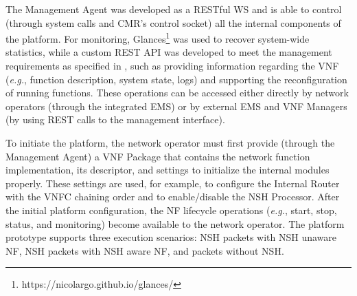 
The Management Agent was developed as a RESTful WS and is able to control (through system calls and CMR's control socket) all the internal components of the platform. For monitoring, Glances\footnote{https://nicolargo.github.io/glances/} was used to recover system-wide statistics, while a custom REST API was developed to meet the management requirements as specified in \cite{Bondan-2014}, such as providing information regarding the VNF (\textit{e.g.}, function description, system state, logs) and supporting the reconfiguration of running functions. These operations can be accessed either directly by network operators (through the integrated EMS) or by external EMS and VNF Managers (by using REST calls to the management interface).

To initiate the platform, the network operator must first provide (through the Management Agent) a VNF Package that contains the network function implementation, its descriptor, and settings to initialize the internal modules properly. These settings are used, for example, to configure the Internal Router with the VNFC chaining order and to enable/disable the NSH Processor. After the initial platform configuration, the NF lifecycle operations (\textit{e.g.}, start, stop, status, and monitoring) become available to the network operator. The platform prototype supports three execution scenarios: NSH packets with NSH unaware NF, NSH packets with NSH aware NF, and packets without NSH.


